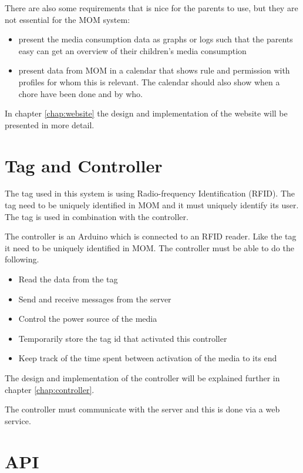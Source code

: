 There are also some requirements that is nice for the parents to use, but they are not essential for the MOM system:

\begin{itemize}
	\item present the media consumption data as graphs or logs such that the parents easy can get an overview of their children's media consumption 
	\item present data from MOM in a calendar that shows rule and permission with profiles for whom this is relevant. The calendar should also show when a chore have been done and by who.
\end{itemize}

In chapter \vref{chap:website} the design and implementation of the website will be presented in more detail. 
 

\section{Tag and Controller}
The tag used in this system is using Radio-frequency Identification (RFID). The tag need to be uniquely identified in MOM and it must uniquely identify its user. The tag is used in combination with the controller.

The controller is an Arduino which is connected to an RFID reader. Like the tag it need to be uniquely identified in MOM. The controller must be able to do the following.

\begin{itemize}
	\item Read the data from the tag
	\item Send and receive messages from the server
	\item Control the power source of the media 
	\item Temporarily store the tag id that activated this controller
	\item Keep track of the time spent between activation of the media to its end
\end{itemize}
 
The design and implementation of the controller will be explained further in chapter \vref{chap:controller}. 

The controller must communicate with the server and this is done via a web service.

\section{API}

